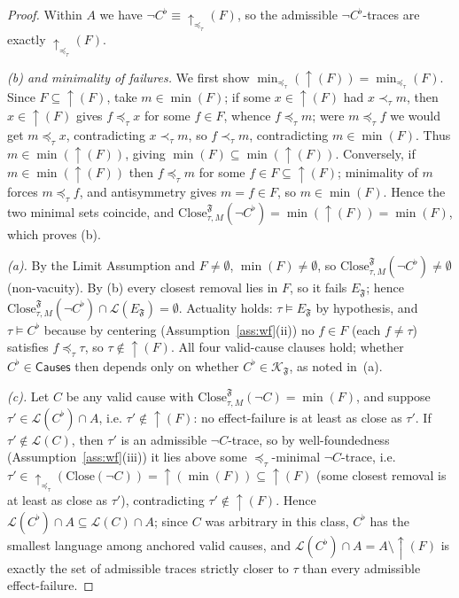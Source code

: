 \documentclass[11pt]{article}
\theoremstyle{remark}
\newcommand{\Close}{\mathrm{Close}}
\newcommand{\Lang}{\mathcal{L}}
\newcommand{\Frame}{\mathfrak{F}}
\begin{document}
\begin{proof}
Within \(A\) we have \(\neg C^{\flat}\equiv\uparrow_{\preceq_\tau}(F)\), so the
admissible \(\neg C^{\flat}\)-traces are exactly \(\uparrow_{\preceq_\tau}(F)\).

\emph{(b) and minimality of failures.} We first show
\(\min_{\preceq_\tau}(\uparrow(F))=\min_{\preceq_\tau}(F)\). Since
\(F\subseteq\uparrow(F)\), take \(m\in\min(F)\); if some
\(x\in\uparrow(F)\) had \(x\prec_\tau m\), then \(x\in\uparrow(F)\) gives
\(f\preceq_\tau x\) for some \(f\in F\), whence \(f\preceq_\tau m\); were
\(m\preceq_\tau f\) we would get \(m\preceq_\tau x\), contradicting
\(x\prec_\tau m\), so \(f\prec_\tau m\), contradicting \(m\in\min(F)\). Thus
\(m\in\min(\uparrow(F))\), giving \(\min(F)\subseteq\min(\uparrow(F))\).
Conversely, if \(m\in\min(\uparrow(F))\) then \(f\preceq_\tau m\) for some
\(f\in F\subseteq\uparrow(F)\); minimality of \(m\) forces \(m\preceq_\tau f\),
and antisymmetry gives \(m=f\in F\), so \(m\in\min(F)\). Hence the two minimal
sets coincide, and \(\Close_{\tau,M}^{\Frame}(\neg C^{\flat})
=\min(\uparrow(F))=\min(F)\), which proves (b).

\emph{(a).} By the Limit Assumption and \(F\neq\emptyset\),
\(\min(F)\neq\emptyset\), so \(\Close_{\tau,M}^{\Frame}(\neg C^{\flat})\neq\emptyset\)
(non-vacuity). By (b) every closest removal lies in \(F\), so it fails
\(E_{\Frame}\); hence \(\Close_{\tau,M}^{\Frame}(\neg C^{\flat})\cap\Lang(E_{\Frame})=\emptyset\).
Actuality holds: \(\tau\models E_{\Frame}\) by hypothesis, and \(\tau\models C^{\flat}\)
because by centering (Assumption~\ref{ass:wf}(ii)) no \(f\in F\) (each
\(f\neq\tau\)) satisfies \(f\preceq_\tau\tau\), so \(\tau\notin\uparrow(F)\). All
four valid-cause clauses hold; whether \(C^{\flat}\in\mathsf{Causes}\) then depends
only on whether \(C^{\flat}\in\mathcal{K}_{\Frame}\), as noted in~(a).

\emph{(c).} Let \(C\) be any valid cause with
\(\Close_{\tau,M}^{\Frame}(\neg C)=\min(F)\), and suppose
\(\tau'\in\Lang(C^{\flat})\cap A\), i.e. \(\tau'\notin\uparrow(F)\): no
effect-failure is at least as close as \(\tau'\). If \(\tau'\notin\Lang(C)\),
then \(\tau'\) is an admissible \(\neg C\)-trace, so by well-foundedness
(Assumption~\ref{ass:wf}(iii)) it lies above some \(\preceq_\tau\)-minimal
\(\neg C\)-trace, i.e.\
\(\tau'\in\uparrow_{\preceq_\tau}(\Close(\neg C))=\uparrow(\min(F))
\subseteq\uparrow(F)\) (some closest removal is at least as close as
\(\tau'\)), contradicting \(\tau'\notin\uparrow(F)\). Hence
\(\Lang(C^{\flat})\cap A\subseteq\Lang(C)\cap A\); since \(C\) was arbitrary in
this class, \(C^{\flat}\) has the smallest language among anchored valid causes,
and \(\Lang(C^{\flat})\cap A=A\setminus\uparrow(F)\) is exactly the set of
admissible traces strictly closer to \(\tau\) than every admissible
effect-failure.
\end{proof}
\end{document}
